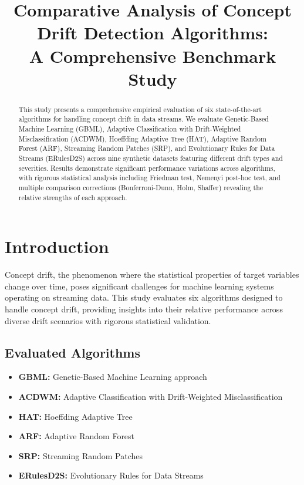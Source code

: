 \documentclass[conference]{IEEEtran}
\begin{document}
\title{Comparative Analysis of Concept Drift Detection Algorithms:\\
A Comprehensive Benchmark Study}

\author{
}

\maketitle

\begin{abstract}
This study presents a comprehensive empirical evaluation of six state-of-the-art algorithms for handling concept drift in data streams. We evaluate Genetic-Based Machine Learning (GBML), Adaptive Classification with Drift-Weighted Misclassification (ACDWM), Hoeffding Adaptive Tree (HAT), Adaptive Random Forest (ARF), Streaming Random Patches (SRP), and Evolutionary Rules for Data Streams (ERulesD2S) across nine synthetic datasets featuring different drift types and severities. Results demonstrate significant performance variations across algorithms, with rigorous statistical analysis including Friedman test, Nemenyi post-hoc test, and multiple comparison corrections (Bonferroni-Dunn, Holm, Shaffer) revealing the relative strengths of each approach.
\end{abstract}

\section{Introduction}

Concept drift, the phenomenon where the statistical properties of target variables change over time, poses significant challenges for machine learning systems operating on streaming data. This study evaluates six algorithms designed to handle concept drift, providing insights into their relative performance across diverse drift scenarios with rigorous statistical validation.

\subsection{Evaluated Algorithms}

\begin{itemize}
\item \textbf{GBML:} Genetic-Based Machine Learning approach
\item \textbf{ACDWM:} Adaptive Classification with Drift-Weighted Misclassification
\item \textbf{HAT:} Hoeffding Adaptive Tree
\item \textbf{ARF:} Adaptive Random Forest
\item \textbf{SRP:} Streaming Random Patches
\item \textbf{ERulesD2S:} Evolutionary Rules for Data Streams
\end{itemize}
\end{document}
